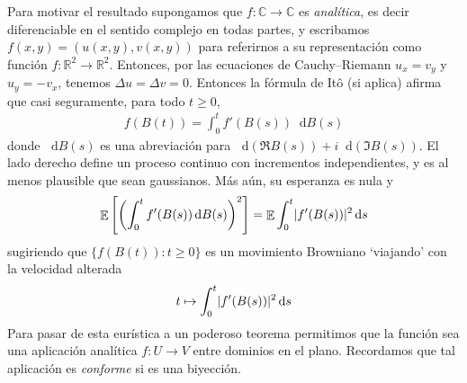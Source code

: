 \documentclass{article}
\newcommand{\ito}{Itô}
\newcommand{\brownian}{B}
\newcommand{\dd}{\mathop{}\!\mathrm{d}}
\newcommand{\realNumbers}{\mathbb{R}}
\newcommand{\complexNumbers}{\mathbb{C}}
\DeclareMathOperator{\Expectation}{\mathbb{E}}
\DeclarePairedDelimiter{\abs}{\lvert}{\rvert}
\theoremstyle{plain}
\theoremstyle{remark}
\theoremstyle{definition}
\begin{document}
Para motivar el resultado supongamos que \(f : \complexNumbers \rightarrow \complexNumbers\) es \emph{analítica}, es decir diferenciable en el sentido complejo en todas partes, y escribamos \(f(x, y) = (u(x, y), v(x, y))\) para referirnos a su representación como función \(f : \realNumbers^2 \rightarrow \realNumbers^2\).
Entonces, por las ecuaciones de Cauchy--Riemann \(u_x = v_y\) y \(u_y = - v_x\), tenemos \(\Delta u = \Delta v = 0\).
Entonces la fórmula de \ito{} (si aplica) afirma que casi seguramente, para todo \(t \geq 0\),
\begin{align}
  f(\brownian(t))
  =
  \int_0^t f'(\brownian(s)) \dd \brownian(s)
\end{align}
donde \(\dd \brownian(s)\) es una abreviación para \(\dd (\Re \brownian(s)) + i \dd (\Im \brownian(s))\).
El lado derecho define un proceso continuo con incrementos independientes, y es al menos plausible que sean gaussianos.
Más aún, su esperanza es nula y
\begin{align}
  \Expectation \left[ \left( \int_0^t f'(\brownian(s)) \dd \brownian(s) \right)^2 \right]
  =
  \Expectation \int_0^t \abs{f'(\brownian(s))}^2 \dd s
\end{align}
sugiriendo que \(\{f(\brownian(t)) : t \geq 0\}\) es un movimiento Browniano `viajando' con la velocidad alterada
\begin{align}
  t
  \mapsto
  \int_0^t \abs{f'(\brownian(s))}^2 \dd s
\end{align}
Para pasar de esta eurística a un poderoso teorema permitimos que la función sea una aplicación analítica \(f : U \rightarrow V\) entre dominios en el plano.
Recordamos que tal aplicación es \emph{conforme} si es una biyección.
\end{document}
